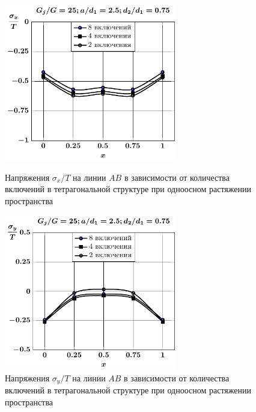 \begin{figure}[h!]
\centering\footnotesize
\parbox[b]{7.5cm}{\centering\includegraphics[width=7.5cm]{inc8-4-2-a25-d75-g25-sig_x-spheroids-tension1.pdf}
\caption{Напряжения $\sigma_x/T$ на линии $AB$ в зависимости от количества включений в тетрагональной структуре при одноосном растяжении пространства
\label{f:9:17}}}\hfil\hfil
\parbox[b]{7.5cm}{\centering\includegraphics[width=7.5cm]{inc8-4-2-a25-d75-g25-sig_y-spheroids-tension1.pdf}
\caption{Напряжения $\sigma_y/T$ на линии $AB$ в зависимости от количества включений в тетрагональной структуре при одноосном растяжении пространства
\label{f:9:18}}}
\end{figure}

